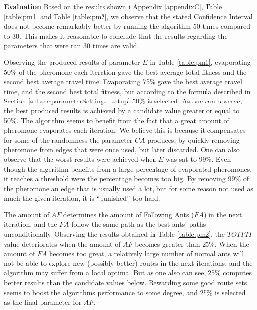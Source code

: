 \textbf{Evaluation}
\newline
Based on the results shown i Appendix \ref{appendixC}, Table \vref{table:pm1} and Table \vref{table:pm2}, we observe that the stated Confidence Interval does not become remarkably better by running the algorithm 50 times compared to 30. This makes it reasonable to conclude that the results regarding the parameters that were ran 30 times are valid. 
\newline

Observing the produced results of parameter $E$ in Table \vref{table:pm1}, evaporating 50\% of the pheromone each iteration gave the best average total fitness and the second best average travel time. Evaporating 75\% gave the best average travel time, and the second best total fitness, but according to the formula described in Section \vref{subsec:parameterSettings_setup} 50\% is selected. As one can observe, the best produced results is achieved by a candidate value greater or equal to 50\%. The algorithm seems to benefit from the fact that a great amount of pheromone evaporates each iteration. We believe this is because it compensates for some of the randomness the parameter $CA$ produces, by quickly removing pheromone from edges that were once used, but later discarded. One can also observe that the worst results were achieved when $E$ was sat to 99\%. Even though the algorithm benefits from a large percentage of evaporated pheromones, it reaches a threshold were the percentage becomes too big. By removing 99\% of the pheromone an edge that is usually used a lot, but for some reason not used as much the given iteration, it is ``punished'' too hard. 
\newline

The amount of $AF$ determines the amount of Following Ants ($FA$) in the next iteration, and the $FA$ follow the same path as the best ants' paths unconditionally. Observing the results obtained in Table \vref{table:pm2}, the $TOTFIT$ value deteriorates when the amount of $AF$ becomes greater than 25\%. When the amount of $FA$ becomes too great, a relatively large number of normal ants will not be able to explore new (possibly better) routes in the next iterations, and the algorithm may suffer from a local optima. But as one also can see, 25\% computes better results than the candidate values below. Rewarding some good route sets seems to boost the algorithms performance to some degree, and 25\% is selected as the final parameter for $AF$.

